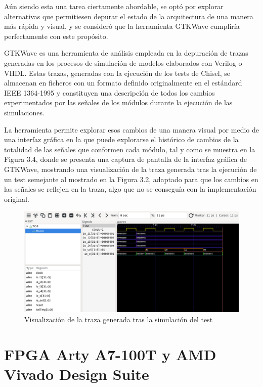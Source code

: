 Aún siendo esta una tarea ciertamente abordable, se optó por explorar alternativas que permitiesen depurar el estado de la arquitectura de una manera más rápida y visual, y se consideró que la herramienta GTKWave cumpliría perfectamente con este propósito.

GTKWave es una herramienta de análisis empleada en la depuración de trazas generadas en los procesos de simulación de modelos elaborados con Verilog o VHDL. Estas trazas, generadas con la ejecución de los tests de Chisel, se almacenan en ficheros con un formato definido originalmente en el estándard IEEE 1364-1995\cite{IEEE1364} y constituyen una descripción de todos los cambios experimentados por las señales de los módulos durante la ejecución de las simulaciones.

La herramienta permite explorar esos cambios de una manera visual por medio de una interfaz gráfica en la que puede explorarse el histórico de cambios de la totalidad de las señales que conformen cada módulo, tal y como se muestra en la Figura 3.4, donde se presenta una captura de pantalla de la interfaz gráfica de GTKWave, mostrando una visualización de la traza generada tras la ejecución de un test semejante al mostrado en la Figura 3.2, adaptado para que los cambios en las señales se reflejen en la traza, algo que no se conseguía con la implementación original.

\vspace{+0.5cm}
\begin{figure}[h]
  \centering
  \includegraphics[width=0.8\linewidth]{res/img/test_mux4_gtkwave.png}
  \caption{Visualización de la traza generada tras la simulación del test}
\end{figure}

\section{FPGA Arty A7-100T y AMD Vivado Design Suite}

